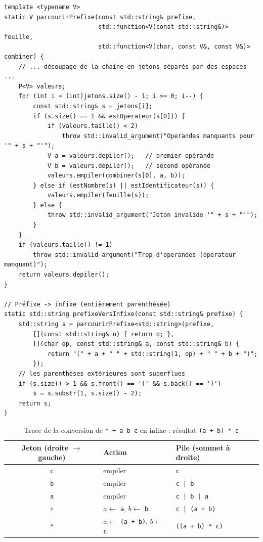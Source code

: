 \documentclass[11pt,a4paper]{article}
\newcommand{\code}[1]{\texttt{#1}}
\begin{document}
\begin{lstlisting}[caption={Parcours générique d'une expression préfixe}]
template <typename V>
static V parcourirPrefixe(const std::string& prefixe,
                          std::function<V(const std::string&)> feuille,
                          std::function<V(char, const V&, const V&)> combiner) {
    // ... découpage de la chaîne en jetons séparés par des espaces ...
    P<V> valeurs;
    for (int i = (int)jetons.size() - 1; i >= 0; i--) {
        const std::string& s = jetons[i];
        if (s.size() == 1 && estOperateur(s[0])) {
            if (valeurs.taille() < 2)
                throw std::invalid_argument("Operandes manquants pour '" + s + "'");
            V a = valeurs.depiler();   // premier opérande
            V b = valeurs.depiler();   // second opérande
            valeurs.empiler(combiner(s[0], a, b));
        } else if (estNombre(s) || estIdentificateur(s)) {
            valeurs.empiler(feuille(s));
        } else {
            throw std::invalid_argument("Jeton invalide '" + s + "'");
        }
    }
    if (valeurs.taille() != 1)
        throw std::invalid_argument("Trop d'operandes (operateur manquant)");
    return valeurs.depiler();
}

// Préfixe -> infixe (entièrement parenthésée)
static std::string prefixeVersInfixe(const std::string& prefixe) {
    std::string s = parcourirPrefixe<std::string>(prefixe,
        [](const std::string& o) { return o; },
        [](char op, const std::string& a, const std::string& b) {
            return "(" + a + " " + std::string(1, op) + " " + b + ")";
        });
    // les parenthèses extérieures sont superflues
    if (s.size() > 1 && s.front() == '(' && s.back() == ')')
        s = s.substr(1, s.size() - 2);
    return s;
}
\end{lstlisting}

\begin{table}[H]
\centering
\small
\begin{tabular}{cll}
  \toprule
  \textbf{Jeton (droite $\to$ gauche)} & \textbf{Action} & \textbf{Pile (sommet à droite)} \\
  \midrule
  \code{c} & empiler & \code{c} \\
  \code{b} & empiler & \code{c | b} \\
  \code{a} & empiler & \code{c | b | a} \\
  \code{+} & $a \gets$ \code{a}, $b \gets$ \code{b} & \code{c | (a + b)} \\
  \code{*} & $a \gets$ \code{(a + b)}, $b \gets$ \code{c} & \code{((a + b) * c)} \\
  \bottomrule
\end{tabular}
\caption{Trace de la conversion de \code{* + a b c} en infixe :
résultat \code{(a + b) * c}}
\end{table}
\end{document}
